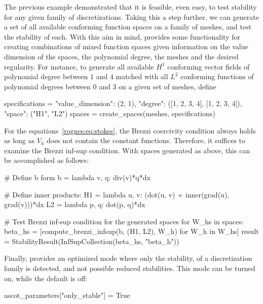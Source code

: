 The previous example demonstrated that it is feasible, even easy, to
test stability for any given family of discretizations. Taking this a
step further, we can generate a set of all available conforming
function spaces on a family of meshes, and test the stability of
each. With this aim in mind, \ascot{} provides some functionality for
creating combinations of mixed function spaces given information on
the value dimension of the spaces, the polynomial degree, the meshes
and the desired regularity. For instance, to generate all available
$H^1$ conforming vector fields of polynomial degree between $1$ and
$4$ matched with all $L^2$ conforming functions of polynomial degrees
between $0$ and $3$ on a given set of meshes, define
\begin{python}
  specifications = {"value_dimension": (2, 1),
                    "degree": ([1, 2, 3, 4], [1, 2, 3, 4]),
                    "space": ("H1", "L2")}
  spaces = create_spaces(meshes, specifications)
\end{python}

For the equations~\eqref{rognes:eq:stokes}, the Brezzi coercivity
condition always holds as long as $V_h$ does not contain the constant
functions. Therefore, it suffices to examine the Brezzi inf-sup
condition. With spaces generated as above, this can be accomplished as
follows:
\begin{python}
# Define b form
b = lambda v, q: div(v)*q*dx

# Define inner products:
H1 = lambda u, v: (dot(u, v) + inner(grad(u), grad(v)))*dx
L2 = lambda p, q: dot(p, q)*dx

# Test Brezzi inf-sup condition for the generated spaces
for W_hs in spaces:
    beta_hs = [compute_brezzi_infsup(b, (H1, L2), W_h) for W_h in W_hs]
    result = StabilityResult(InfSupCollection(beta_hs, "beta_h"))
\end{python}
Finally, \ascot{} provides an optimized mode where only the stability,
of a discretization family is detected, and not possible reduced
stabilities. This mode can be turned on, while the default is off:
\begin{python}
 ascot_parameters["only_stable"] = True
\end{python}

